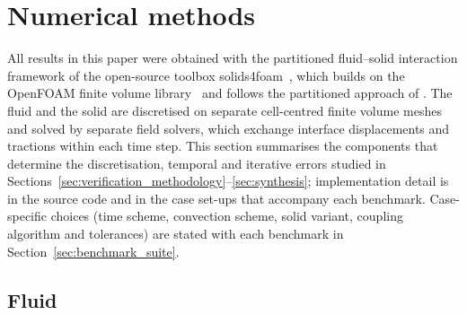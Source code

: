 \section{Numerical methods}\label{sec:numerical_methods}

All results in this paper were obtained with the partitioned fluid--solid interaction framework of the open-source toolbox solids4foam~\citep{Cardiff2025}, which builds on the OpenFOAM finite volume library~\citep{Weller1998} and follows the partitioned approach of \citet{Tukovic2018}.
The fluid and the solid are discretised on separate cell-centred finite volume meshes and solved by separate field solvers, which exchange interface displacements and tractions within each time step.
This section summarises the components that determine the discretisation, temporal and iterative errors studied in Sections~\ref{sec:verification_methodology}--\ref{sec:synthesis}; implementation detail is in the source code and in the case set-ups that accompany each benchmark.
Case-specific choices (time scheme, convection scheme, solid variant, coupling algorithm and tolerances) are stated with each benchmark in Section~\ref{sec:benchmark_suite}.

\subsection{Fluid}\label{sec:fluid_solver}

